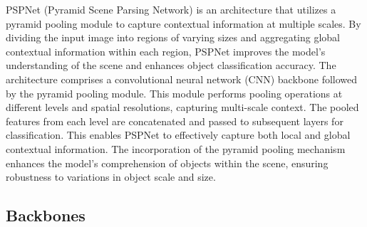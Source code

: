 PSPNet (Pyramid Scene Parsing Network) \cite{Zhao2017} is an
architecture that utilizes a pyramid pooling module to capture contextual
information at multiple scales. By dividing the input image into regions of
varying sizes and aggregating global contextual information within each region,
PSPNet improves the model's understanding of the scene and enhances object
classification accuracy. The architecture comprises a convolutional neural
network (CNN) backbone followed by the pyramid pooling module. This module
performs pooling operations at different levels and spatial resolutions,
capturing multi-scale context. The pooled features from each level are
concatenated and passed to subsequent layers for classification. This enables
PSPNet to effectively capture both local and global contextual information. The
incorporation of the pyramid pooling mechanism enhances the model's
comprehension of objects within the scene, ensuring robustness to variations in
object scale and size.

\subsection{Backbones}

